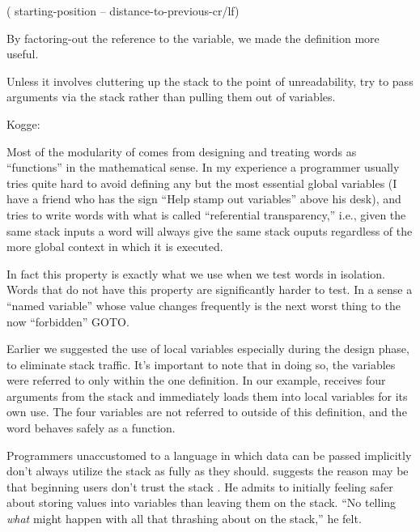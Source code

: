\begin{Code}
( starting-position -- distance-to-previous-cr/lf)
\end{Code}
By factoring-out the reference to the variable, we made the definition
more useful.

\begin{tip}
Unless it involves cluttering up the stack to the point of unreadability, try
to pass arguments via the stack rather than pulling them out of variables.
\end{tip}
\begin{interview}
Kogge:
\begin{tfquot}
Most of the modularity of \Forth{} comes from designing and treating
\Forth{} words as ``functions'' in the mathematical sense. In my experience
a \Forth{} programmer usually tries quite hard to avoid defining any but
the most essential global variables (I have a friend who has the sign ``Help
stamp out variables'' above his desk), and tries to write words with what is
called ``referential transparency,'' i.e., given the same stack inputs a word
will always give the same stack ouputs regardless of the more global
context in which it is executed.

In fact this property is exactly what we use when we test words in isolation.
Words that do not have this property are significantly harder to test. In a
sense a ``named variable'' whose value changes frequently is the next worst
thing to the now ``forbidden'' GOTO.
\end{tfquot}
\end{interview}


Earlier we suggested the use of local variables especially during the
design phase, to eliminate stack traffic. It's important to note that in
doing so, the variables were referred to only within the one definition. In
our example, \forth{[BOX]} receives four arguments from the stack and immediately
loads them into local variables for its own use. The four variables are not
referred to outside of this definition, and the word behaves safely as a
function.

Programmers unaccustomed to a language in which data can be passed
implicitly don't always utilize the stack as fully as they should.
 suggests the reason may be that beginning \Forth{} users
don't trust the stack \cite{ham83}. He admits to initially feeling
safer about storing values into variables than leaving them on the
stack. ``No telling \emph{what} might happen with all that thrashing
about on the stack,'' he felt.

